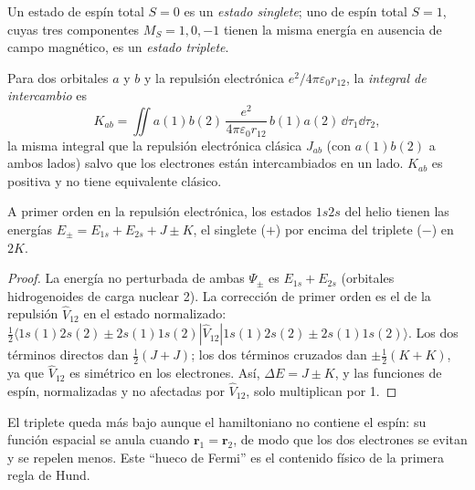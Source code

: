 \begin{definition}\label{def:b3:many-electron-atoms:singlet-triplet}
Un estado de espín total $S = 0$ es un \emph{estado singlete};
uno de espín total $S = 1$, cuyas tres componentes $M_S = 1, 0, -1$ tienen la
misma energía en ausencia de campo magnético, es un \emph{estado
triplete}.
\end{definition}

\begin{definition}\label{def:b3:many-electron-atoms:exchange}
Para dos orbitales $a$ y $b$ y la repulsión electrónica $e^2/4\pi\varepsilon_0
r_{12}$, la \emph{integral de intercambio} es
\[
K_{ab} = \iint a(1)b(2)\,\frac{e^2}{4\pi\varepsilon_0r_{12}}\,b(1)a(2)\,\dd\tau_1\dd\tau_2,
\]
la misma integral que la repulsión electrónica clásica $J_{ab}$ (con
$a(1)b(2)$ a ambos lados) salvo que los electrones están intercambiados en un
lado. $K_{ab}$ es positiva y no tiene equivalente clásico.
\end{definition}

\begin{proposition}\label{prop:b3:many-electron-atoms:helium}
A primer orden en la repulsión electrónica, los estados $1s2s$ del helio tienen
las energías $E_\pm = E_{1s} + E_{2s} + J \pm K$, el singlete ($+$) por encima del
triplete ($-$) en $2K$.
\end{proposition}

\begin{proof}
La energía no perturbada de ambas $\Psi_\pm$ es $E_{1s} + E_{2s}$ (orbitales
hidrogenoides de carga nuclear 2). La corrección de primer orden es el
 de la repulsión $\hat V_{12}$ en el estado normalizado:
$\frac12\langle 1s(1)2s(2) \pm 2s(1)1s(2)|\hat V_{12}|1s(1)2s(2) \pm
2s(1)1s(2)\rangle$. Los dos términos directos dan $\frac12(J + J)$; los dos términos
cruzados dan $\pm\frac12(K + K)$, ya que $\hat V_{12}$ es simétrico en los
electrones. Así, $\Delta E = J \pm K$, y las funciones de espín, normalizadas y
no afectadas por $\hat V_{12}$, solo multiplican por 1.
\end{proof}

El triplete queda más bajo aunque el hamiltoniano no contiene el espín: su
función espacial se anula cuando $\mathbf r_1 = \mathbf r_2$, de modo que los dos
electrones se evitan y se repelen menos. Este ``hueco de Fermi'' es el
contenido físico de la primera regla de Hund.

